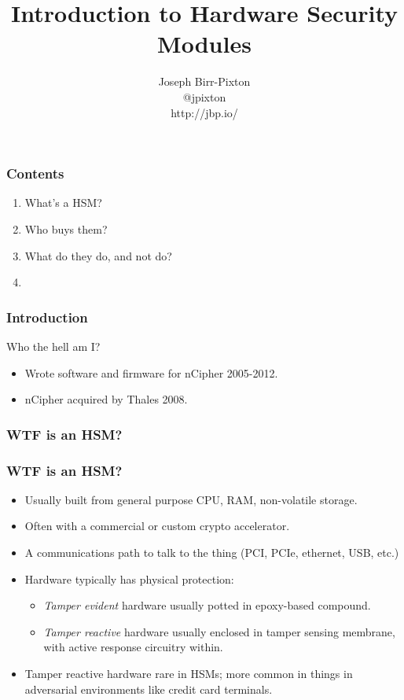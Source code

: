 \documentclass{beamer}
\title[hsms]{Introduction to Hardware Security Modules}
\author{Joseph Birr-Pixton\\
@jpixton\\
http://jbp.io/}
\date{}
\begin{document}
\frame{\titlepage}

\frame
{
  \frametitle{Contents}

  \begin{enumerate}
    \item<1> What's a HSM?
    \item<2> Who buys them?
    \item<3> What do they do, and not do?
    \item<4> 
  \end{enumerate}
}

\frame
{
  \frametitle{Introduction}
  Who the hell am I?

  \begin{itemize}
    \item<1->{Wrote software and firmware for nCipher 2005-2012.}
    \item<2->{nCipher acquired by Thales 2008.}
  \end{itemize}
}

\frame
{
  \frametitle{WTF is an HSM?}

}

\frame
{
  \frametitle{WTF is an HSM?}

  \begin{itemize}
  \item<1-> Usually built from general purpose CPU, RAM, non-volatile storage.
  \item<2-> Often with a commercial or custom crypto accelerator.
  \item<3-> A communications path to talk to the thing (PCI, PCIe, ethernet, USB, etc.)
  \item<4-> Hardware typically has physical protection:
    \begin{itemize}
    \item<5-> \emph{Tamper evident} hardware usually potted in epoxy-based compound.
    \item<6-> \emph{Tamper reactive} hardware usually enclosed in tamper sensing membrane, with active response circuitry within.
    \end{itemize}
  \item<7-> Tamper reactive hardware rare in HSMs; more common in things in adversarial environments like credit card terminals.
  \end{itemize}
}
\end{document}
